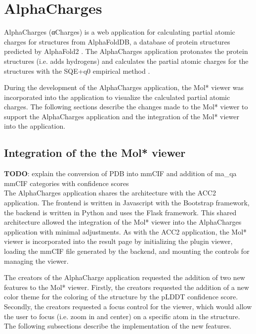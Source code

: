 \documentclass[
  digital,     %
  oneside,     %
  nosansbold,  %
  nocolorbold, %
  lof,         %
  lot,         %
]{fithesis4}
\begin{document}
\chapter{AlphaCharges}

AlphaCharges (αCharges) is a web application for calculating partial atomic charges for structures from AlphaFoldDB, a database of protein structures predicted by AlphaFold2 \cite{jumper2021alphafold}. The AlphaCharges application protonates the protein structures (i.e. adds hydrogens) and calculates the partial atomic charges for the structures with the SQE+q0 empirical method \cite{schindler2021sqe}. \cite{schindler2023alphacharges}

During the development of the AlphaCharges application, the Mol* viewer was incorporated into the application to visualize the calculated partial atomic charges. The following sections describe the changes made to the Mol* viewer to support the AlphaCharges application and the integration of the Mol* viewer into the application.

\section{Integration of the the Mol* viewer}

\textbf{TODO}: explain the conversion of PDB into mmCIF and addition of ma\_qa mmCIF categories with confidence scores \\

The AlphaCharges application shares the architecture with the ACC2 application. The frontend is written in Javascript with the Bootstrap framework, the backend is written in Python and uses the Flask framework. This shared architecture allowed the integration of the Mol* viewer into the AlphaCharges application with minimal adjustments. As with the ACC2 application, the Mol* viewer is incorporated into the result page by initializing the plugin viewer, loading the mmCIF file generated by the backend, and mounting the controls for managing the viewer.

The creators of the AlphaCharge application requested the addition of two new features to the Mol* viewer. Firstly, the creators requested the addition of a new color theme for the coloring of the structure by the pLDDT confidence score. Secondly, the creators requested a focus control for the viewer, which would allow the user to focus (i.e. zoom in and center) on a specific atom in the structure. The following subsections describe the implementation of the new features.
\end{document}
